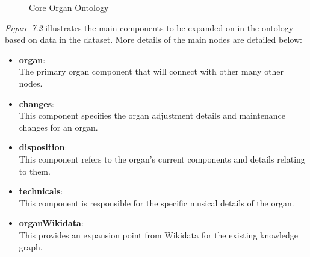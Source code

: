 \begin{figure}[H]
    \begin{center}
    \end{center}
    \vspace{-0.4cm}
\caption{Core Organ Ontology}
\end{figure}
\vspace{-0.1cm}

\textit{Figure 7.2} illustrates the main components to be expanded on in the ontology based on data in the dataset. More details of the main nodes are detailed below:

\vspace{-0.1cm}
\begin{itemize}
    \item \textbf{organ}: \vspace{-0.075cm}\\ The primary organ component that will connect with other many other nodes.
    \vspace{-0.15cm}
    \item \textbf{changes}:\vspace{-0.075cm}\\ This component specifies the organ adjustment details and maintenance changes for an organ.
    \vspace{-0.15cm}
    \item \textbf{disposition}:\vspace{-0.075cm}\\ This component refers to the organ's current components and details relating to them.
    \vspace{-0.15cm}
    \item \textbf{technicals}: \vspace{-0.075cm}\\This component is responsible for the specific musical details of the organ. 
    \vspace{-0.15cm}
    \item \textbf{organWikidata}:\vspace{-0.075cm} \\This provides an expansion point from Wikidata for the existing knowledge graph.
\end{itemize}

